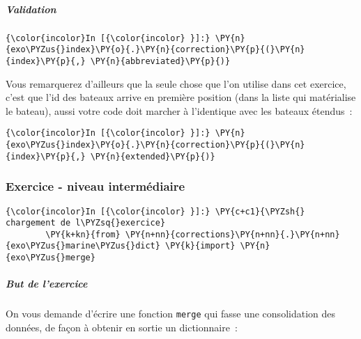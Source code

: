     \hypertarget{validation}{%
\subparagraph{Validation}\label{validation}}

    \begin{Verbatim}[commandchars=\\\{\}]
{\color{incolor}In [{\color{incolor} }]:} \PY{n}{exo\PYZus{}index}\PY{o}{.}\PY{n}{correction}\PY{p}{(}\PY{n}{index}\PY{p}{,} \PY{n}{abbreviated}\PY{p}{)}
\end{Verbatim}


    Vous remarquerez d'ailleurs que la seule chose que l'on utilise dans cet
exercice, c'est que l'id des bateaux arrive en première position (dans
la liste qui matérialise le bateau), aussi votre code doit marcher à
l'identique avec les bateaux étendus~:

    \begin{Verbatim}[commandchars=\\\{\}]
{\color{incolor}In [{\color{incolor} }]:} \PY{n}{exo\PYZus{}index}\PY{o}{.}\PY{n}{correction}\PY{p}{(}\PY{n}{index}\PY{p}{,} \PY{n}{extended}\PY{p}{)}
\end{Verbatim}


    \hypertarget{exercice---niveau-intermuxe9diaire}{%
\subsubsection{Exercice - niveau
intermédiaire}\label{exercice---niveau-intermuxe9diaire}}

    \begin{Verbatim}[commandchars=\\\{\}]
{\color{incolor}In [{\color{incolor} }]:} \PY{c+c1}{\PYZsh{} chargement de l\PYZsq{}exercice}
        \PY{k+kn}{from} \PY{n+nn}{corrections}\PY{n+nn}{.}\PY{n+nn}{exo\PYZus{}marine\PYZus{}dict} \PY{k}{import} \PY{n}{exo\PYZus{}merge}
\end{Verbatim}


    \hypertarget{but-de-lexercice}{%
\subparagraph{But de l'exercice}\label{but-de-lexercice}}

    On vous demande d'écrire une fonction \texttt{merge} qui fasse une
consolidation des données, de façon à obtenir en sortie un
dictionnaire~:

\begin{Shaded}
\begin{Highlighting}[]
 \OperatorTok{->}
\end{Highlighting}
\end{Shaded}

